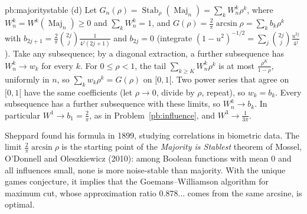 \begin{solution}{pb:majoritystable}
(d) Let $G_n(\rho)=\operatorname{Stab}_\rho(\operatorname{Maj}_n)=\sum_kW^k_n\rho^k$, where $W^k_n=W^k(\operatorname{Maj}_n)\ge0$ and $\sum_kW^k_n=1$, and $G(\rho)=\frac2\pi\arcsin\rho=\sum_kb_k\rho^k$ with
$b_{2j+1}=\frac2\pi\binom{2j}j\frac1{4^j(2j+1)}$ and $b_{2j}=0$ (integrate $(1-u^2)^{-1/2}=\sum_j\binom{2j}j\frac{u^{2j}}{4^j}$). Take any subsequence; by a diagonal extraction, a
further subsequence has $W^k_n\to w_k$ for every $k$. For $0\le\rho<1$, the tail $\sum_{k\ge K}W^k_n\rho^k$ is at most $\frac{\rho^K}{1-\rho}$, uniformly in $n$, so
$\sum_kw_k\rho^k=G(\rho)$ on $[0,1[$. Two power series that agree on $[0,1[$ have the same coefficients (let $\rho\to0$, divide by $\rho$, repeat), so
$w_k=b_k$. Every subsequence has a further subsequence with these limits, so $W^k_n\to b_k$. In particular $W^1\to b_1=\frac2\pi$, as in
Problem~\ref{pb:influence}, and $W^3\to\frac1{3\pi}$.

\leads Sheppard found his formula in 1899, studying correlations in biometric data. The limit $\frac2\pi\arcsin\rho$ is the starting point of
the \emph{Majority is Stablest} theorem of Mossel, O'Donnell and Oleszkiewicz (2010): among Boolean functions with mean $0$ and all
influences small, none is more noise-stable than majority. With the unique games conjecture, it implies that the Goemans--Williamson
algorithm for maximum cut, whose approximation ratio $0.878\ldots$ comes from the same arcsine, is optimal.
\end{solution}

